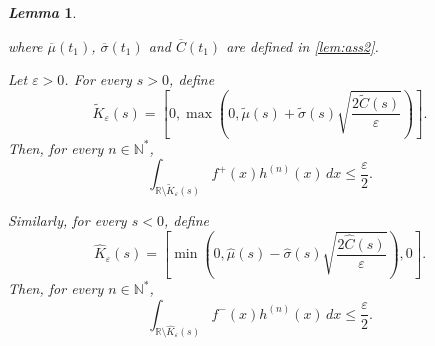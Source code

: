 \documentclass[review]{elsarticle}
\newtheorem{lemma}{\em Lemma}
\begin{document}
\begin{lemma}
\begin{enumerate}
    where $\overline{\mu}(t_1)$, $\overline{\sigma}(t_1)$ and $\overline{C}(t_1)$ are defined in \eqref{lem:ass2}.

{\color{blue}
    \item[(ii)] Let $\varepsilon>0$.
For every $s>0$, define
\begin{equation}
\label{eq:size_compact_f+}
\widetilde{K}_{\varepsilon}(s)
=
\left[0,\max\left(0,\widetilde{\mu}(s)+\widetilde{\sigma}(s)\sqrt{\frac{2\widetilde{C}(s)}{\varepsilon}}\right)\right].
\end{equation}
Then, for every $n\in\mathbb{N}^*$,
\begin{equation}
\int_{\mathbb{R}\setminus \widetilde{K}_{\varepsilon}(s)} f^+(x)h^{(n)}(x)\,dx
\le \frac{\varepsilon}{2}.
\end{equation}

Similarly, for every $s<0$, define
\begin{equation}
\label{eq:size_compact_f-}
\widehat{K}_{\varepsilon}(s)
=
\left[\min\left(0,\widehat{\mu}(s)-\widehat{\sigma}(s)\sqrt{\frac{2\widehat{C}(s)}{\varepsilon}}\right),0\right].
\end{equation}
Then, for every $n\in\mathbb{N}^*$,
\begin{equation}
\int_{\mathbb{R}\setminus \widehat{K}_{\varepsilon}(s)} f^-(x)h^{(n)}(x)\,dx
\le \frac{\varepsilon}{2}.
\end{equation}
}
\end{enumerate}
 

\end{lemma}
\end{document}
